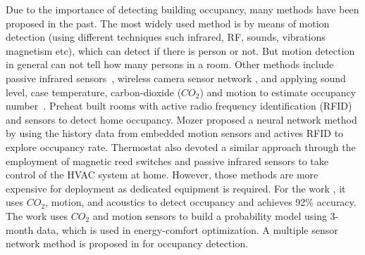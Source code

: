 Due to the importance of detecting building occupancy, many methods
have been proposed in the past. The most widely used method is by
means of motion detection (using different techniques such infrared,
RF, sounds, vibrations magnetism etc), which can detect if there is
person or not. But motion detection in general can not tell how many
persons in a room.  Other methods include passive infrared
sensors~\cite{Dodier2006Building}, wireless camera sensor network
\cite{erickson2009energy}, and applying sound level, case temperature,
carbon-dioxide ($CO_2$) and motion to estimate occupancy
number~\cite{Ekwevugbe2013Real}.  Preheat \cite{scott2011ctrl} built
rooms with active radio frequency identification (RFID) and sensors to
detect home occupancy. Mozer \cite{mozer1997neurothermostat} proposed
a neural network method by using the history data from embedded motion
sensors and actives RFID to explore occupancy rate. Thermostat
\cite{lu2010smartthermostat} also devoted a similar approach through
the employment of magnetic reed switches and passive infrared sensors
to take control of the HVAC system at home. However, those methods are
more expensive for deployment as dedicated equipment is required.
\textcolor{feb18rev}{For the work \cite{dong2014real}, it uses $CO_2$,
  motion, and acoustics to detect occupancy and achieves 92\%
  accuracy.  The work \cite{majumdar2014energy} uses $CO_2$ and motion
  sensors to build a probability model using 3-month data, which is
  used in energy-comfort optimization. A multiple sensor network
  method is proposed in \cite{yang2016review} for occupancy
  detection.}

